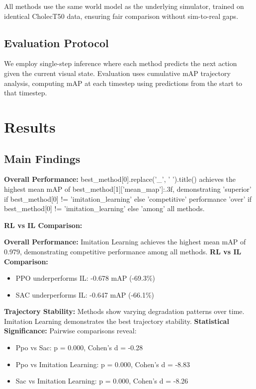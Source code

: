 \documentclass[conference]{IEEEtran}
\begin{document}
All methods use the same world model as the underlying simulator, trained on identical CholecT50 data, ensuring fair comparison without sim-to-real gaps.

\subsection{Evaluation Protocol}
We employ single-step inference where each method predicts the next action given the current visual state. Evaluation uses cumulative mAP trajectory analysis, computing mAP at each timestep using predictions from the start to that timestep.

\section{Results}



\subsection{Main Findings}

\textbf{Overall Performance:} {best_method[0].replace('_', ' ').title()} achieves the highest mean mAP of {best_method[1]['mean_map']:.3f}, demonstrating {'superior' if best_method[0] != 'imitation_learning' else 'competitive'} performance {'over' if best_method[0] != 'imitation_learning' else 'among'} all methods.

\textbf{RL vs IL Comparison:}

\textbf{Overall Performance:} Imitation Learning achieves the highest mean mAP of 0.979, demonstrating competitive performance among all methods.
\textbf{RL vs IL Comparison:}
\begin{itemize}
\item PPO underperforms IL: -0.678 mAP (-69.3\%)
\item SAC underperforms IL: -0.647 mAP (-66.1\%)
\end{itemize}

\textbf{Trajectory Stability:} Methods show varying degradation patterns over time. Imitation Learning demonstrates the best trajectory stability.
\textbf{Statistical Significance:} Pairwise comparisons reveal:
\begin{itemize}
\item Ppo vs Sac: p = 0.000, Cohen's d = -0.28
\item Ppo vs Imitation Learning: p = 0.000, Cohen's d = -8.83
\item Sac vs Imitation Learning: p = 0.000, Cohen's d = -8.26
\end{itemize}
\end{document}
